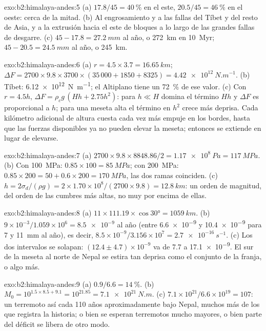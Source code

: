 \begin{solution}{exo:b2:himalaya-andes:5}
(a) $17.8/45 = \qty{40}{\percent}$ en el este, $20.5/45 = \qty{46}{\percent}$ en el oeste:
cerca de la mitad. (b) Al engrosamiento y a las fallas del Tíbet y del resto de Asia, y a
la extrusión hacia el este de bloques a lo largo de las grandes fallas de desgarre. (c) $45 - 17.8 =
\qty{27.2}{mm}$ al año, o \qty{272}{km} en \qty{10}{Myr}; $45 - 20.5 = \qty{24.5}{mm}$ al
año, o \qty{245}{km}.
\end{solution}

\begin{solution}{exo:b2:himalaya-andes:6}
(a) $r = 4.5\times3.7 = \qty{16.65}{km}$; $\Delta F = 2700\times9.8\times3700\times(35\,000 +
1850 + 8325) = \qty{4.42e12}{N.m^{-1}}$. (b) Tíbet: \qty{6.12e12}{N.m^{-1}}; el Altiplano
tiene un \qty{72}{\percent} de ese valor. (c) Con $r = 4.5h$, $\Delta F = \rho_c g\,(Hh + 2.75h^2)$: para
$h \ll H$ domina el término $Hh$ y $\Delta F$ es proporcional a $h$; para una meseta alta
el término en $h^2$ crece más deprisa. Cada kilómetro adicional de altura cuesta cada vez más empuje en
los bordes, hasta que las fuerzas disponibles ya no pueden elevar la meseta; entonces se extiende
en lugar de elevarse.
\end{solution}

\begin{solution}{exo:b2:himalaya-andes:7}
(a) $2700\times9.8\times8848.86/2 = \qty{1.17e8}{Pa} = \qty{117}{MPa}$. (b) Con
\qty{100}{MPa}: $0.85\times100 = \qty{85}{MPa}$; con \qty{200}{MPa}: $0.85\times200 = 50 +
0.6\times200 = \qty{170}{MPa}$, las dos ramas coinciden. (c) $h = 2\sigma_d/(\rho g) =
2\times1.70\times10^8/(2700\times9.8) = \qty{12.8}{km}$: un orden de magnitud, del orden
de las cumbres más altas, no muy por encima de ellas.
\end{solution}

\begin{solution}{exo:b2:himalaya-andes:8}
(a) $11\times111.19\times\cos\ang{30} = \qty{1059}{km}$. (b) $9\times10^{-3}/1.059\times10^{6}
= \num{8.5e-9}$ al año (entre \num{6.6e-9} y \num{10.4e-9} para 7 y \qty{11}{mm} al año),
es decir, $8.5\times10^{-9}/3.156\times10^{7} = \qty{2.7e-16}{s^{-1}}$. (c) Los dos intervalos
se solapan: $(12.4 \pm 4.7) \times 10^{-9}$ va de 7.7 a \num{17.1e-9}. El sur de la meseta al norte de
Nepal se estira tan deprisa como el conjunto de la franja, o algo más.
\end{solution}

\begin{solution}{exo:b2:himalaya-andes:9}
(a) $0.9/6.6 = \qty{14}{\percent}$. (b) $M_0 = 10^{1.5\times8.5 + 9.1} = 10^{21.85} =
\qty{7.1e21}{N.m}$. (c) $7.1\times10^{21}/6.6\times10^{19} = 107$: un terremoto así cada
110 años aproximadamente bajo Nepal, muchos más de los que registra la historia; o bien se esperan terremotos mucho mayores,
o bien parte del déficit se libera de otro modo.
\end{solution}

